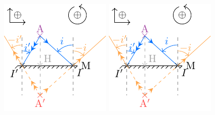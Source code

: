 \documentclass[a4paper, 10pt, final, garamond]{book}
\begin{document}
\begin{enumerate}[label=\sqenumi, leftmargin=10pt]
\begin{isd}[righthand ratio=.2]
\begin{center}
{        \includegraphics[width=\linewidth, draft=true]{mir_plan-obj_r}
      }{
        \includegraphics[width=\linewidth]{mir_plan-obj_r}
}
\end{center}
\end{isd}
\end{enumerate}
\end{document}
